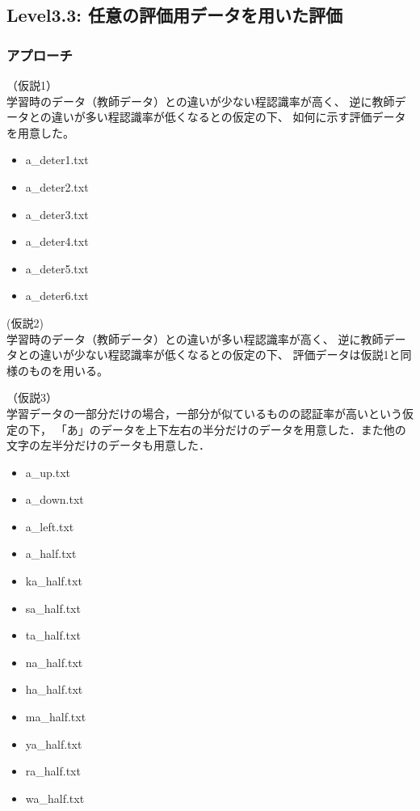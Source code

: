 \subsection{Level3.3: 任意の評価用データを用いた評価}
\subsubsection{アプローチ}
（仮説1）\\
学習時のデータ（教師データ）との違いが少ない程認識率が高く、
逆に教師データとの違いが多い程認識率が低くなるとの仮定の下、
如何に示す評価データを用意した。
\begin{itemize}
	\item a\_deter1.txt
	\item a\_deter2.txt
	\item a\_deter3.txt
	\item a\_deter4.txt
	\item a\_deter5.txt
	\item a\_deter6.txt
\end{itemize}

 (仮説2) \\
 学習時のデータ（教師データ）との違いが多い程認識率が高く、
 逆に教師データとの違いが少ない程認識率が低くなるとの仮定の下、
 評価データは仮説1と同様のものを用いる。

（仮説3）\\
学習データの一部分だけの場合，一部分が似ているものの認証率が高いという仮定の下，
「あ」のデータを上下左右の半分だけのデータを用意した．また他の文字の左半分だけのデータも用意した．
\begin{itemize}
	\item a\_up.txt
	\item a\_down.txt
	\item a\_left.txt
	\item a\_half.txt 
	\item ka\_half.txt
	\item sa\_half.txt
	\item ta\_half.txt
	\item na\_half.txt
	\item ha\_half.txt
	\item ma\_half.txt
	\item ya\_half.txt
	\item ra\_half.txt
	\item wa\_half.txt
\end{itemize}


